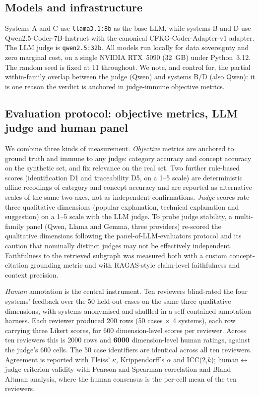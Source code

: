 \documentclass[sageh]{sagej}
\begin{document}
\subsection{Models and infrastructure}
Systems A and C use \texttt{llama3.1:8b} as the base LLM, while systems B and D use Qwen2.5-Coder-7B-Instruct with the canonical CFKG-Coder-Adapter-v1 adapter. The LLM judge is \texttt{qwen2.5:32b}. All models run locally for data sovereignty and zero marginal cost, on a single NVIDIA RTX~5090 (32~GB) under Python~3.12. The random seed is fixed at 11 throughout. We note, and control for, the partial within-family overlap between the judge (Qwen) and systems B/D (also Qwen): it is one reason the verdict is anchored in judge-immune objective metrics.

\subsection{Evaluation protocol: objective metrics, LLM judge and human panel}
We combine three kinds of measurement. \emph{Objective} metrics are anchored to ground truth and immune to any judge: category accuracy and concept accuracy on the synthetic set, and fix relevance on the real set. Two further rule-based scores (identification D1 and traceability D5, on a 1--5 scale) are deterministic affine recodings of category and concept accuracy and are reported as alternative scales of the same two axes, not as independent confirmations. \emph{Judge} scores rate three qualitative dimensions (popular explanation, technical explanation and suggestion) on a 1--5 scale with the LLM judge. To probe judge stability, a multi-family panel (Qwen, Llama and Gemma, three providers) re-scored the qualitative dimensions following the panel-of-LLM-evaluators protocol and its caution that nominally distinct judges may not be effectively independent.\cite{verga2024poll,li2024judges} Faithfulness to the retrieved subgraph was measured both with a custom concept-citation grounding metric and with RAGAS-style claim-level faithfulness and context precision.\cite{es2023ragas}

\emph{Human} annotation is the central instrument. Ten reviewers blind-rated the four systems' feedback over the 50 held-out cases on the same three qualitative dimensions, with systems anonymised and shuffled in a self-contained annotation harness. Each reviewer produced 200 rows (50 cases $\times$ 4 systems), each row carrying three Likert scores, for 600 dimension-level scores per reviewer. Across ten reviewers this is 2000 rows and \textbf{6000} dimension-level human ratings, against the judge's 600 cells. The 50 case identifiers are identical across all ten reviewers. Agreement is reported with Fleiss' $\kappa$, Krippendorff's $\alpha$ and ICC(2,$k$); human$\leftrightarrow$judge criterion validity with Pearson and Spearman correlation and Bland--Altman analysis, where the human consensus is the per-cell mean of the ten reviewers.\cite{fleiss1971kappa,krippendorff2018content,shrout1979icc,bland1986agreement}
\end{document}

